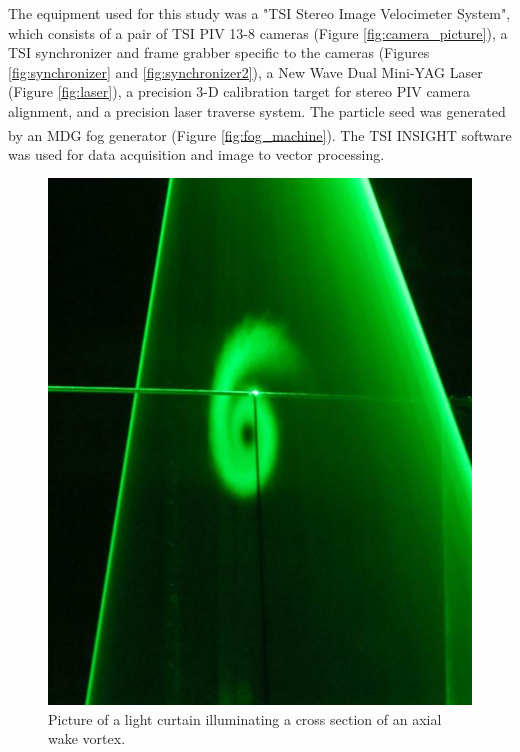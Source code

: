 The equipment used for this study was a "TSI Stereo Image Velocimeter System", 
which consists of a pair of TSI PIV 13-8 cameras (Figure 
\ref{fig:camera_picture}), a TSI synchronizer and frame 
grabber specific to the cameras (Figures \ref{fig:synchronizer} and 
\ref{fig:synchronizer2}), a New Wave Dual Mini-YAG Laser (Figure 
\ref{fig:laser}), a precision 3-D calibration target for stereo 
PIV camera alignment, and a precision laser traverse system. The particle seed 
was generated by an MDG fog generator (Figure \ref{fig:fog_machine}). The TSI 
INSIGHT\textsuperscript{\textcopyright} software was used 
for data acquisition and image to vector processing.

\begin{figure}[H]
	\centering
	\includegraphics[width=5in]{figs/piv_method/laser_sheet_picture}
	\caption{Picture of a light curtain illuminating a cross section of an 
	axial wake vortex.}
	\label{fig:laser_sheet_picture}
\end{figure}

